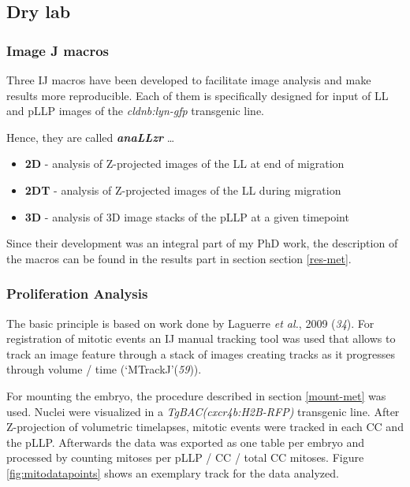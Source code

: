 \documentclass[10pt, b5paper, singlespacinge, twoside]{reedthesis} %
\providecommand{\tightlist}{%
  \setlength{\itemsep}{0pt}\setlength{\parskip}{0pt}}
\theoremstyle{definition}
\theoremstyle{definition}
\theoremstyle{definition}
\theoremstyle{remark}
\begin{document}
\hypertarget{comp-met}{%
\subsection{Dry lab}\label{comp-met}}

\hypertarget{image-j-macros}{%
\subsubsection{Image J macros}\label{image-j-macros}}

Three IJ macros have been developed to facilitate image analysis and make results more reproducible. Each of them is specifically designed for input of LL and pLLP images of the \emph{cldnb:lyn-gfp} transgenic line.

Hence, they are called \textbf{\emph{anaLLzr}} \ldots{}
\begin{itemize}
\tightlist
\item
  \textbf{2D} - analysis of Z-projected images of the LL at end of migration
\item
  \textbf{2DT} - analysis of Z-projected images of the LL during migration
\item
  \textbf{3D} - analysis of 3D image stacks of the pLLP at a given timepoint
\end{itemize}
Since their development was an integral part of my PhD work, the description of the macros can be found in the results part in section section \ref{res-met}.

\hypertarget{prolif}{%
\subsubsection{Proliferation Analysis}\label{prolif}}

The basic principle is based on work done by Laguerre \emph{et al.}, 2009 (\emph{34}). For registration of mitotic events an IJ manual tracking tool was used that allows to track an image feature through a stack of images creating tracks as it progresses through volume / time (`MTrackJ'(\emph{59})).

For mounting the embryo, the procedure described in section \ref{mount-met} was used. Nuclei were visualized in a \emph{TgBAC(cxcr4b:H2B-RFP)} transgenic line. After Z-projection of volumetric timelapses, mitotic events were tracked in each CC and the pLLP. Afterwards the data was exported as one table per embryo and processed by counting mitoses per pLLP / CC / total CC mitoses. Figure \ref{fig:mitodatapoints} shows an exemplary track for the data analyzed.
\end{document}
